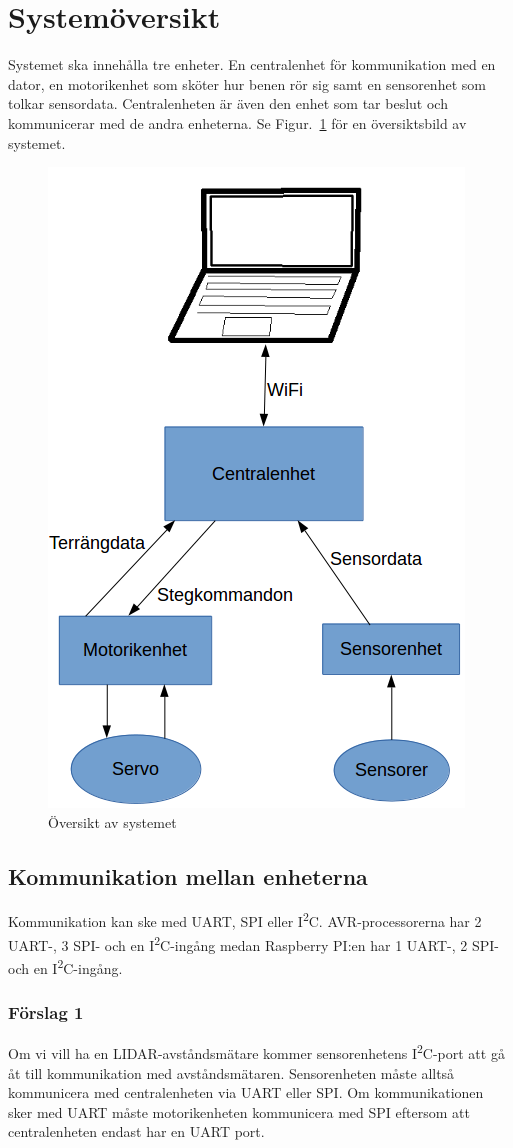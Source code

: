 \documentclass[a4paper,titlepage,12pt]{article}
\newcommand{\itc}{I\textsuperscript{2}C}
\begin{document}
	\section{Systemöversikt}
	Systemet ska innehålla tre enheter. En centralenhet för kommunikation med en
    dator, en motorikenhet som sköter hur benen rör sig samt en sensorenhet som
    tolkar sensordata. Centralenheten är även den enhet som tar beslut och
    kommunicerar med de andra enheterna. Se Figur.~\ref{fig:overview} för en översiktsbild av
    systemet.
	\begin{figure}[h]
		\centering
		\includegraphics[width=0.5\linewidth]{../images/overview.png}
		\caption{Översikt av systemet\label{fig:overview}}
	\end{figure}

	\subsection{Kommunikation mellan enheterna}
	Kommunikation kan ske med UART, SPI eller \itc{}. AVR-processorerna har
	2 UART-, 3 SPI- och en \itc{}-ingång medan Raspberry PI:en har 1 UART-, 2 SPI- och
	en \itc{}-ingång. 

	\subsubsection{Förslag 1}
	Om vi vill ha en LIDAR-avståndsmätare kommer sensorenhetens \itc{}-port att gå åt
	till kommunikation med avståndsmätaren. Sensorenheten måste alltså kommunicera med
	centralenheten via UART eller SPI. Om kommunikationen sker med UART måste 
	motorikenheten kommunicera med SPI eftersom att centralenheten endast har en
	UART port.
\end{document}
